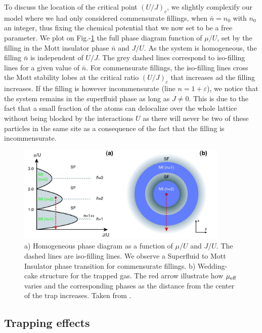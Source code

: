 To discuss the location of the critical point $(U/J)_c$, we slightly complexify our model where we had only considered commensurate fillings, \ie when $\bar{n}=n_0$ with $n_0$ an integer, thus fixing the chemical potential that we now set to be a free parameter. We plot on Fig.-\ref{fig:mott_lobes} the full phase diagram function of $\mu/U$, set by the filling in the Mott insulator phase $\bar{n}$ and $J/U$. As the system is homogeneous, the filling $\bar{n}$ is independent of $U/J$. The grey dashed lines correspond to iso-filling lines for a given value of $\bar{n}$. For commensurate fillings, the iso-filling lines cross the Mott stability lobes at the critical ratio $(U/J)_c$ that increases ad the filling increases. If the filling is however incommensurate (line $n=1+\varepsilon$), we notice that the system remains in the superfluid phase as long as $J \neq 0$. This is due to the fact that a small fraction of the atoms can delocalize over the whole lattice without being blocked by the interactions $U$ as there will never be two of these particles in the same site as a consequence of the fact that the filling is incommensurate.

\begin{figure}
    \centering
    \includegraphics[width=0.9\textwidth]{Fig/Chapter2/mott_lobes.png}
    \caption{a) Homogeneous phase diagram as a function of $\mu/U$ and $J/U$. The dashed lines are iso-filling lines. We observe a Superfluid to Mott Insulator phase transition for commensurate fillings. b) Wedding-cake structure for the trapped gas. The red arrow illustrate how $\mu_{\rm{eff}}$ varies and the corresponding phases as the distance from the center of the trap increases. Taken from \cite{bloch2008many}.}
    \label{fig:mott_lobes}
\end{figure}


\subsection{Trapping effects}

